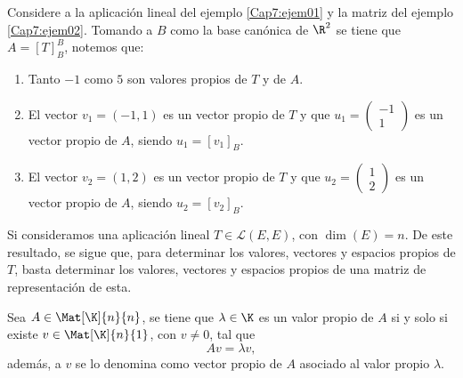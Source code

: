 \documentclass[compacto,10pt]{pubciencias-notas}
\begin{document}
\begin{ejem}\hspace{0pt} Considere a la aplicación lineal del ejemplo \ref{Cap7:ejem01} y la matriz del ejemplo \ref{Cap7:ejem02}. Tomando a $B$ como la base canónica de $\R^{2}$ se tiene que $A = [T]_{B}^{B}$, notemos que:
\begin{enumerate}
    \item Tanto $-1$ como $5$ son valores propios de $T$ y de $A$.
    \item El vector $v_{1} = (-1,1)$ es un vector propio de $T$ y que $u_{1} = \begin{pmatrix}-1\\1\end{pmatrix}$ es un vector propio de $A$, siendo 
    $u_{1} = [v_{1}]_{B}$.
    \item El vector $v_{2} = (1,2)$ es un vector propio de $T$ y que $u_{2} = \begin{pmatrix}1\\2\end{pmatrix}$ es un vector propio de $A$, siendo 
    $u_{2} = [v_{2}]_{B}$.
\end{enumerate}
\end{ejem}

\begin{obs}
Si consideramos una aplicación lineal $T\in\mathscr{L}(E, E)$, con $\dim(E)=n$. De este resultado, se sigue que, para determinar los valores, vectores y espacios propios de $T$, basta determinar los valores, vectores y espacios propios de una matriz de representación de esta.
\end{obs}

\begin{prop}
Sea $A\in \Mat[\K]{n}{n}$, se tiene que $\lambda\in \K$ es un valor propio de $A$ si y solo si existe $v\in \Mat[\K]{n}{1}$, con $v\neq 0$, tal que
\[
    Av = \lambda v,
\]
además, a $v$ se lo denomina como vector propio de $A$ asociado al valor propio $\lambda$.
\end{prop}
\end{document}
